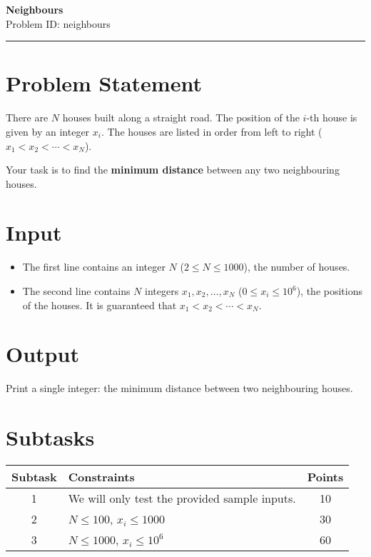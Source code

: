 \documentclass[12pt,a4paper]{article}
\begin{document}
\ifdefined\BOOKLET
  \pagestyle{empty}
\fi

\begin{center}
    {\LARGE \textbf{Neighbours}} \\[0.5em]
    {Problem ID: neighbours} \\[1em]
    \rule{\textwidth}{0.4pt}
\end{center}

\vspace{1em}

\section*{Problem Statement}
There are $N$ houses built along a straight road.  
The position of the $i$-th house is given by an integer $x_i$.  
The houses are listed in order from left to right ($x_1 < x_2 < \cdots < x_N$).  

Your task is to find the \textbf{minimum distance} between any two neighbouring houses.

\section*{Input}
\begin{itemize}
    \item The first line contains an integer $N$ ($2 \leq N \leq 1000$), the number of houses.  
    \item The second line contains $N$ integers $x_1, x_2, \ldots, x_N$ ($0 \leq x_i \leq 10^6$),  
    the positions of the houses. It is guaranteed that $x_1 < x_2 < \cdots < x_N$.  
\end{itemize}

\section*{Output}
Print a single integer: the minimum distance between two neighbouring houses.

\section*{Subtasks}
\begin{center}
\begin{tabularx}{\textwidth}{|c|X|c|}
\hline
\textbf{Subtask} & \textbf{Constraints} & \textbf{Points} \\
\hline
1 & We will only test the provided sample inputs. & 10 \\
\hline
2 & $N \leq 100$, $x_i \leq 1000$ & 30 \\
\hline
3 & $N \leq 1000$, $x_i \leq 10^6$ & 60 \\
\hline
\end{tabularx}
\end{center}
\end{document}

